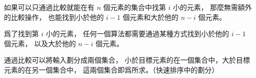\startEXERCISE\DIFFICULT
如果可以只通過比較就能在有 $n$ 個元素的集合中找第 $i$ 小的元素，
那麼無需額外的比較操作，
也能找到小於他的 $i-1$ 個元素和大於他的 $n-i$ 個元素。
\stopEXERCISE

\startANSWER
爲了找到第 $i$ 小的元素，
任何一個算法都需要通過某種方式找到小於他的 $i-1$ 個元素，
以及大於他的 $n-i$ 個元素。

通過比較可以將輸入劃分成兩個集合，
小於目標元素的在一個集合中，大於目標元素的在另一個集合中，
這兩個集合即爲所求。（快速排序中的劃分）
\stopANSWER
